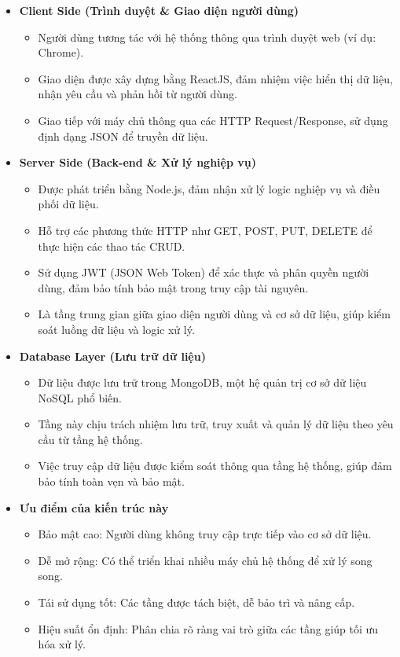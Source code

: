 \begin{itemize}
    \item[1.] \textbf{Client Side (Trình duyệt \& Giao diện người dùng)}
    \begin{itemize}
        \item[-] Người dùng tương tác với hệ thống thông qua trình duyệt web (ví dụ: Chrome).
        \item[-] Giao diện được xây dựng bằng ReactJS, đảm nhiệm việc hiển thị dữ liệu, nhận yêu cầu và phản hồi từ người dùng.
        \item[-] Giao tiếp với máy chủ thông qua các HTTP Request/Response, sử dụng định dạng JSON để truyền dữ liệu.
    \end{itemize}
    \item[2.] \textbf{Server Side (Back-end \& Xử lý nghiệp vụ)}
    \begin{itemize}
        \item[-] Được phát triển bằng Node.js, đảm nhận xử lý logic nghiệp vụ và điều phối dữ liệu.
        \item[-] Hỗ trợ các phương thức HTTP như GET, POST, PUT, DELETE để thực hiện các thao tác CRUD.
        \item[-] Sử dụng JWT (JSON Web Token) để xác thực và phân quyền người dùng, đảm bảo tính bảo mật trong truy cập tài nguyên.
        \item[-] Là tầng trung gian giữa giao diện người dùng và cơ sở dữ liệu, giúp kiểm soát luồng dữ liệu và logic xử lý.
    \end{itemize}
    \item[3.] \textbf{Database Layer (Lưu trữ dữ liệu)}
    \begin{itemize}
        \item[-] Dữ liệu được lưu trữ trong MongoDB, một hệ quản trị cơ sở dữ liệu NoSQL phổ biến.
        \item[-] Tầng này chịu trách nhiệm lưu trữ, truy xuất và quản lý dữ liệu theo yêu cầu từ tầng hệ thống.
        \item[-] Việc truy cập dữ liệu được kiểm soát thông qua tầng hệ thống, giúp đảm bảo tính toàn vẹn và bảo mật.
    \end{itemize}
    \item[4.] \textbf{Ưu điểm của kiến trúc này}
    \begin{itemize}
        \item[-] Bảo mật cao: Người dùng không truy cập trực tiếp vào cơ sở dữ liệu.
        \item[-] Dễ mở rộng: Có thể triển khai nhiều máy chủ hệ thống để xử lý song song.
        \item[-] Tái sử dụng tốt: Các tầng được tách biệt, dễ bảo trì và nâng cấp.
        \item[-] Hiệu suất ổn định: Phân chia rõ ràng vai trò giữa các tầng giúp tối ưu hóa xử lý.
    \end{itemize}
\end{itemize}

